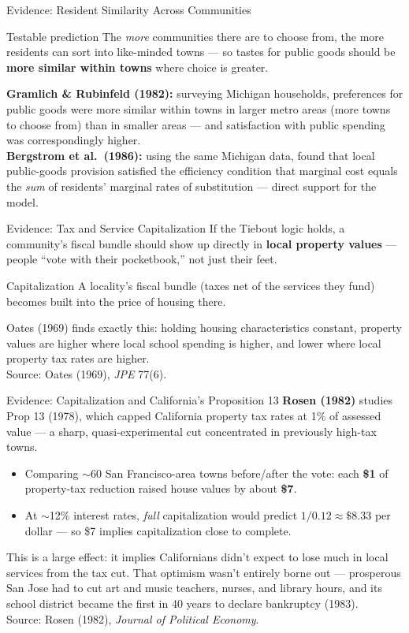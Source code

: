 \documentclass[11pt,aspectratio=169]{beamer}
\newcommand{\srcnote}[1]{{\footnotesize\color{wugray}Source: #1}}
\begin{document}
\begin{frame}{Evidence: Resident Similarity Across Communities}
  \begin{block}{Testable prediction}
    The \emph{more} communities there are to choose from, the more residents can sort into like-minded towns --- so tastes for public goods should be \textbf{more similar within towns} where choice is greater.
  \end{block}
  \small \textbf{Gramlich \& Rubinfeld (1982):} surveying Michigan households, preferences for public goods were more similar within towns in larger metro areas (more towns to choose from) than in smaller areas --- and satisfaction with public spending was correspondingly higher.\\
  \textbf{Bergstrom et al.\ (1986):} using the same Michigan data, found that local public-goods provision satisfied the efficiency condition that marginal cost equals the \emph{sum} of residents' marginal rates of substitution --- direct support for the model.
\end{frame}

\begin{frame}{Evidence: Tax and Service Capitalization}
  If the Tiebout logic holds, a community's fiscal bundle should show up directly in \textbf{local property values} --- people ``vote with their pocketbook,'' not just their feet.
  \begin{block}{Capitalization}
    A locality's fiscal bundle (taxes net of the services they fund) becomes built into the price of housing there.
  \end{block}
  \small Oates (1969) finds exactly this: holding housing characteristics constant, property values are higher where local school spending is higher, and lower where local property tax rates are higher.\\
  \srcnote{Oates (1969), \emph{JPE} 77(6).}
\end{frame}

\begin{frame}{Evidence: Capitalization and California's Proposition 13}
  \textbf{Rosen (1982)} studies Prop 13 (1978), which capped California property tax rates at 1\% of assessed value --- a sharp, quasi-experimental cut concentrated in previously high-tax towns.
  \begin{itemize}
    \item Comparing $\sim$60 San Francisco-area towns before/after the vote: each \textbf{\$1} of property-tax reduction raised house values by about \textbf{\$7}.
    \item At $\sim$12\% interest rates, \emph{full} capitalization would predict $1/0.12 \approx \$8.33$ per dollar --- so \$7 implies capitalization close to complete.
  \end{itemize}
  \small This is a large effect: it implies Californians didn't expect to lose much in local services from the tax cut. That optimism wasn't entirely borne out --- prosperous San Jose had to cut art and music teachers, nurses, and library hours, and its school district became the first in 40 years to declare bankruptcy (1983).\\
  \srcnote{Rosen (1982), \emph{Journal of Political Economy}.}
\end{frame}
\end{document}
